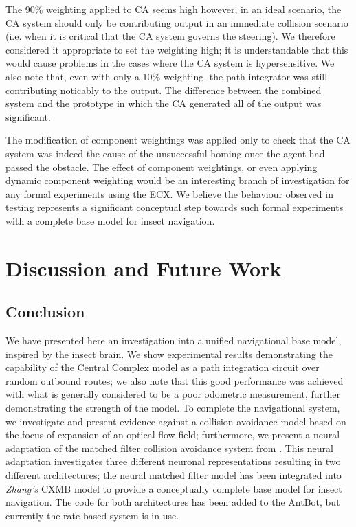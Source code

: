 \documentclass[a4paper,11pt,twoside,openright]{article}
\let\oldsection\section
\def\section{\cleardoublepage\oldsection}
\begin{document}
The 90\% weighting applied to CA seems high however, in an ideal
scenario, the CA system should only be contributing output in an
immediate collision scenario (i.e. when it is critical that the CA
system governs the steering). We therefore considered it appropriate
to set the weighting high; it is understandable that this would cause
problems in the cases where the CA system is hypersensitive. We also
note that, even with only a 10\% weighting, the path integrator was
still contributing noticably to the output. The difference between the
combined system and the prototype in which the CA generated all of the
output was significant.
\newline\par

The modification of component weightings was applied only to check
that the CA system was indeed the cause of the unsuccessful homing
once the agent had passed the obstacle. The effect of component
weightings, or even applying dynamic component weighting would be an
interesting branch of investigation for any formal experiments using
the ECX. We believe the behaviour observed in testing represents a
significant conceptual step towards such formal experiments with a
complete base model for insect navigation.
\newpage


\section{ Discussion and Future Work}
\subsection{Conclusion}
We have presented here an investigation into a unified navigational
base model, inspired by the insect brain. We show experimental results
demonstrating the capability of the Central Complex model as a path
integration circuit over random outbound routes; we also note that
this good performance was achieved with what is generally considered
to be a poor odometric measurement, further demonstrating the strength of
the model. To complete the navigational system, we investigate and
present evidence against a collision avoidance model based on the focus
of expansion of an optical flow field; furthermore, we present a
neural adaptation of the matched filter collision avoidance system
from \cite{Mitchell2018}. This neural adaptation investigates three
different neuronal representations resulting in two different
architectures; the neural matched filter model has been integrated
into \textit{Zhang's} CXMB model to provide a conceptually complete
base model for insect navigation. The code for both architectures
has been added to the AntBot, but currently the rate-based system is
in use.\newline\par
\end{document}
